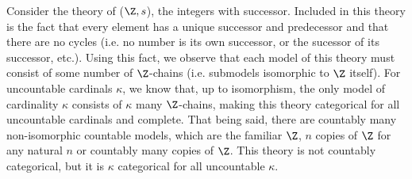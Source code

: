 \begin{example}\label{example_categoricity_integers}
Consider the theory of (\(\Z, s\)), the integers with successor. 
Included in this theory is the fact that every element has a unique successor and predecessor and that there are no cycles (i.e. no number is its own successor, or the sucessor of its successor, etc.). 
Using this fact, we observe that each model of this theory must consist of some number of \(\Z\)-chains (i.e. submodels isomorphic to \(\Z\) itself). 
For uncountable cardinals \(\kappa\), we know that, up to isomorphism, the only model of cardinality \(\kappa\) consists of \(\kappa\) many \(\Z\)-chains,
making this theory categorical for all uncountable cardinals and complete. 
That being said, there are countably many non-isomorphic countable models, which are the familiar \(\Z\), \(n\) copies of \(\Z\) for any natural \(n\) or countably many copies of \(\Z\). 
This theory is not countably categorical, but it is \(\kappa\) categorical for all uncountable \(\kappa\). 
\end{example}

